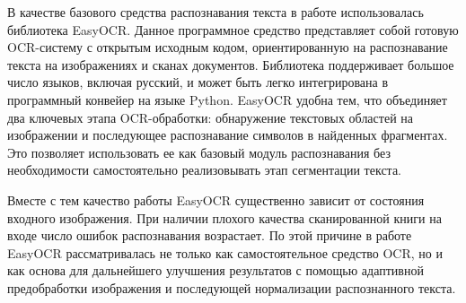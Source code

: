 В качестве базового средства распознавания текста в работе использовалась библиотека EasyOCR. Данное программное средство представляет собой готовую OCR-систему с открытым исходным кодом, ориентированную на распознавание текста на изображениях и сканах документов. Библиотека поддерживает большое число языков, включая русский, и может быть легко интегрирована в программный конвейер на языке Python. EasyOCR удобна тем, что объединяет два ключевых этапа OCR-обработки: обнаружение текстовых областей на изображении и последующее распознавание символов в найденных фрагментах. Это позволяет использовать ее как базовый модуль распознавания без необходимости самостоятельно реализовывать этап сегментации текста.

Вместе с тем качество работы EasyOCR существенно зависит от состояния входного изображения. При наличии плохого качества сканированной книги на входе число ошибок распознавания возрастает. По этой причине в работе EasyOCR рассматривалась не только как самостоятельное средство OCR, но и как основа для дальнейшего улучшения результатов с помощью адаптивной предобработки изображения и последующей нормализации распознанного текста.
